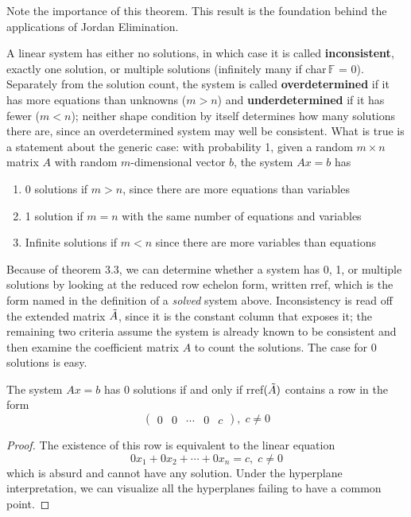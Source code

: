   Note the importance of this theorem. This result is the foundation behind the applications of Jordan Elimination.

  \begin{definition}
    \label{def:classification-of-linear-systems-by-solution}
    A linear system has either no solutions, in which case it is called \textbf{inconsistent}, exactly one solution, or multiple solutions (infinitely many if char$\, \mathbb{F}$ = 0). Separately from the solution count, the system is called \textbf{overdetermined} if it has more equations than unknowns ($m > n$) and \textbf{underdetermined} if it has fewer ($m < n$); neither shape condition by itself determines how many solutions there are, since an overdetermined system may well be consistent. What is true is a statement about the generic case: with probability 1, given a random $m \times n$ matrix $A$ with random $m$-dimensional vector $b$, the system $A x = b$ has
    \begin{enumerate}
      \item 0 solutions if $m > n$, since there are more equations than variables
      \item 1 solution if $m = n$ with the same number of equations and variables
      \item Infinite solutions if $m < n$ since there are more variables than equations
    \end{enumerate}
  \end{definition}

  Because of theorem 3.3, we can determine whether a system has 0, 1, or multiple solutions by looking at the reduced row echelon form, written rref, which is the form named in the definition of a \textit{solved} system above. Inconsistency is read off the extended matrix $\Tilde{A}$, since it is the constant column that exposes it; the remaining two criteria assume the system is already known to be consistent and then examine the coefficient matrix $A$ to count the solutions. The case for 0 solutions is easy. 

  \begin{theorem}
    \label{thm:criterion-for-an-inconsistent-system}
    The system $A x = b$ has 0 solutions if and only if rref$(\Tilde{A})$ contains a row in the form 
    \begin{equation}
      \begin{pmatrix}
      0 & 0 & \cdots & 0 & c
      \end{pmatrix}, \; c \neq 0
    \end{equation}
  \end{theorem}
  \begin{proof}
    The existence of this row is equivalent to the linear equation
    \begin{equation}
      0 x_1 + 0 x_2 + \cdots + 0 x_n = c, \; c \neq 0
    \end{equation}
    which is absurd and cannot have any solution. Under the hyperplane interpretation, we can visualize all the hyperplanes failing to have a common point. 
  \end{proof}


